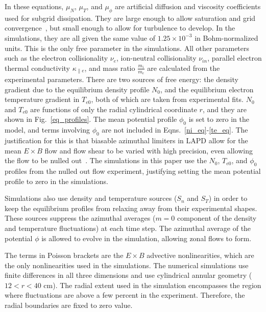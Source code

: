 \documentclass[showpacs,preprintnumbers,amsmath,amssymb,superscriptaddress,aip]{revtex4-1}
\newcommand{\nue}{\nu_{e}}
\newcommand{\nuin}{\nu_{in}}
\newcommand{\kpe}{\kappa_{\parallel e}}
\newcommand{\fmie}{\frac{m_i}{m_e}}
\begin{document}
In these equations, $\mu_N$, $\mu_T$, and $\mu_\phi$ are artificial diffusion and viscosity coefficients used for subgrid dissipation. They are large enough to allow saturation
and grid convergence~\cite{friedman2012}, but small enough to allow for turbulence to develop. In the simulations, they are all given the same value of $1.25 \times 10^{-3}$ in Bohm-normalized units. 
This is the only free parameter in the simulations. All other parameters such as the electron collisionality $\nue$, ion-neutral
collisionality $\nuin$, parallel electron thermal conductivity $\kpe$, and mass ratio $\fmie$ are calculated from the experimental parameters.
There are two sources of free energy: the density gradient due to the equilibrium density profile $N_0$, and the equilibrium electron temperature gradient in $T_{e0}$, both of which are
taken from experimental fits. $N_0$ and $T_{e0}$ are functions of only the radial cylindrical coordinate $r$, and they are shown in Fig.~\ref{eq_profiles}. 
The mean potential profile $\phi_0$ is set to zero in the model, and terms involving $\phi_0$ are not included in Eqns.~\ref{ni_eq}-\ref{te_eq}. 
The justification for this is that biasable azimuthal limiters in LAPD allow for the mean $E \times B$ flow and flow shear to be varied with high precision, even allowing the flow to be
nulled out~\cite{schaffner2012}. 
The simulations in this paper use the $N_0$, $T_{e0}$, and $\phi_0$ profiles from the nulled out flow experiment, justifying setting the mean potential profile to zero in the simulations.

Simulations also use density and temperature sources ($S_n$ and $S_T$) in order to keep the equilibrium profiles from relaxing away from their experimental shapes. 
These sources suppress the azimuthal averages ($m=0$ component of the density and temperature fluctuations) at each time step. 
The azimuthal average of the potential $\phi$ is allowed to evolve in
the simulation, allowing zonal flows to form.

The terms in Poisson brackets are the $E \times B$ advective nonlinearities, which are the only nonlinearities used in the simulations.
The numerical simulations use finite differences in all three dimensions and use cylindrical annular geometry ($12<r<40$ cm). The radial extent used in the simulation
encompasses the region where fluctuations are above a few percent in the experiment. Therefore, the radial boundaries are fixed to zero value.
\end{document}
